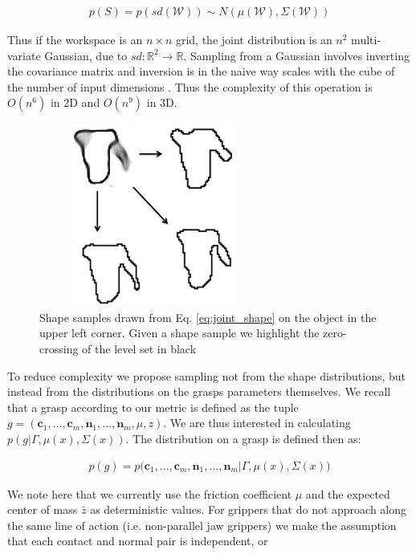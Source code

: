 \documentclass[letterpaper, 10 pt, conference]{ieeeconf}  %
\begin{document}
\begin{align}\label{eq:joint_shape}
p(S) = p(sd(\mathcal{W})) \sim N(\mu(\mathcal{W}),\Sigma(\mathcal{W}))
\end{align}

Thus if the workspace is an $n \times n$ grid, the joint distribution is an  $n^2$ multi-variate Gaussian, due to $sd:\mathbb{R}^2 \rightarrow \mathbb{R}$.  Sampling from a Gaussian involves inverting the covariance matrix and inversion is in the naive way scales with the cube of the number of input dimensions \cite{petersen2008matrix}. Thus the complexity of this operation is $O(n^6)$ in 2D and $O(n^9)$ in 3D. 


\begin{figure}[ht!]
\centering
\includegraphics[width = 7.5cm, height= 6cm ]{figures/Slide13.jpg}
\caption{Shape samples drawn from Eq. \ref{eq:joint_shape} on the object in the upper left corner. Given a shape sample we highlight the zero-crossing of the level set in black}
\vspace*{-10pt}
\label{fig:shape_samples}
\end{figure}


To reduce complexity we propose sampling not from the shape distributions, but instead from the distributions on the grasps parameters themselves. We recall that a grasp according to our metric is defined as the tuple $g = ( \textbf{c}_1,...,\textbf{c}_m,\textbf{n}_1,...,\textbf{n}_m,\mu, z )$. We are thus interested in calculating $p(g|\Gamma,\mu(x),\Sigma(x))$. The distribution on a grasp is defined then as: 

\begin{align}\label{eq:joint_on_shape}
p(g) = p\big(\textbf{c}_1,...,\textbf{c}_m,\textbf{n}_1,...,\textbf{n}_m|\Gamma,\mu(x),\Sigma(x)\big)
\end{align}

We note here that we currently use the friction coefficient $\mu$ and the expected center of mass $\bar{z}$ as deterministic values. For grippers that do not approach along the same line of action (i.e. non-parallel jaw grippers) we make the assumption that each contact and normal pair is independent, or 
\end{document}
